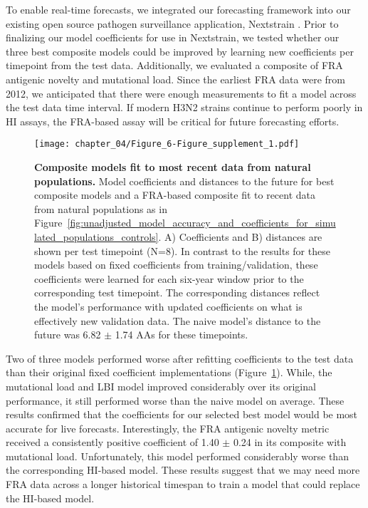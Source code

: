 To enable real-time forecasts, we integrated our forecasting framework into our existing open source pathogen surveillance application, Nextstrain \citep{Hadfield2018}.
Prior to finalizing our model coefficients for use in Nextstrain, we tested whether our three best composite models could be improved by learning new coefficients per timepoint from the test data.
Additionally, we evaluated a composite of FRA antigenic novelty and mutational load.
Since the earliest FRA data were from 2012, we anticipated that there were enough measurements to fit a model across the test data time interval.
If modern H3N2 strains continue to perform poorly in HI assays, the FRA-based assay will be critical for future forecasting efforts.

\begin{figure}
  \texttt{[image: chapter\_04/Figure\_6-Figure\_supplement\_1.pdf]}
  \caption[{Composite models fit to most recent data from natural populations.}]{
    {\bf Composite models fit to most recent data from natural populations.}
    Model coefficients and distances to the future for best composite models and a FRA-based composite fit to recent data from natural populations as in Figure~\ref{fig:unadjusted_model_accuracy_and_coefficients_for_simulated_populations_controls}.
    A) Coefficients and B) distances are shown per test timepoint (N=8).
    In contrast to the results for these models based on fixed coefficients from training/validation, these coefficients were learned for each six-year window prior to the corresponding test timepoint.
    The corresponding distances reflect the model's performance with updated coefficients on what is effectively new validation data.
    The naive model's distance to the future was 6.82 $\pm$ 1.74 AAs for these timepoints.
  }
  \label{fig:updated_model_accuracy_and_coefficients_for_natural_populations_across_test_data}
\end{figure}

Two of three models performed worse after refitting coefficients to the test data than their original fixed coefficient implementations (Figure~\ref{fig:updated_model_accuracy_and_coefficients_for_natural_populations_across_test_data}).
While, the mutational load and LBI model improved considerably over its original performance, it still performed worse than the naive model on average.
These results confirmed that the coefficients for our selected best model would be most accurate for live forecasts.
Interestingly, the FRA antigenic novelty metric received a consistently positive coefficient of 1.40 $\pm$ 0.24 in its composite with mutational load.
Unfortunately, this model performed considerably worse than the corresponding HI-based model.
These results suggest that we may need more FRA data across a longer historical timespan to train a model that could replace the HI-based model.

